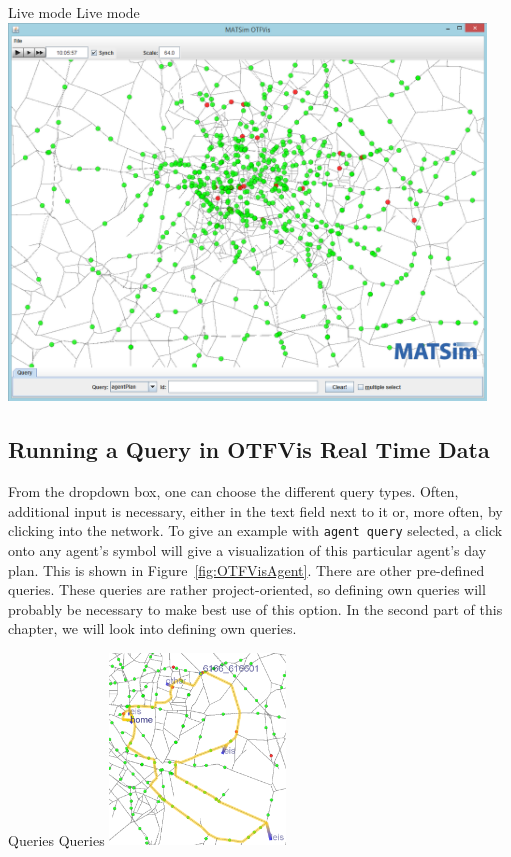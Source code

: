 \createfigure%
{Live mode}%
{Live mode}%
{\label{fig:OTFVisLive}}%
{\includegraphics[width=0.95\textwidth, angle=0]{extending/figures/otfvis/image04.png}}%
{}

\subsection{Running a Query in OTFVis Real Time Data}
From the dropdown box, one can choose the different query types. 
Often, additional input is necessary, either in the text field next to it or, more often, by clicking into the network. 
To give an example with \lstinline|agent query| selected, a click onto any agent's symbol will give a visualization of this particular agent's day plan. 
This is shown in Figure~\ref{fig:OTFVisAgent}. There are other pre-defined queries. 
These queries are rather project-oriented, so defining own queries will probably be necessary to make best use of this option. 
In the second part of this chapter, we will look into defining own queries.

\createfigure%
{Queries}%
{Queries}%
{\label{fig:OTFVisAgent}}%
{\includegraphics[width=0.35\textwidth, angle=0]{extending/figures/otfvis/image08.png}}%
{}

